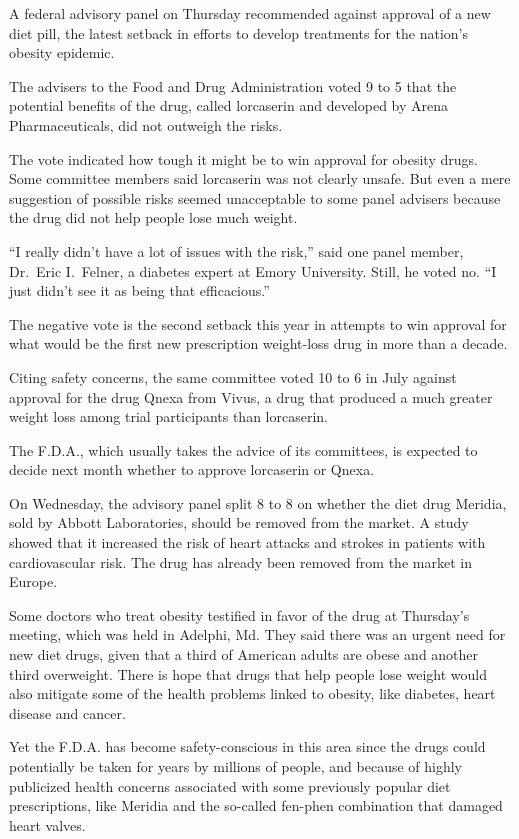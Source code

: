 ﻿\documentclass[12pt]{article}
\begin{document}
\lettrine{A}{} federal advisory panel on Thursday recommended against
approval of a new diet pill, the latest setback in efforts to develop treatments for the nation's
obesity epidemic.

The advisers to the Food and Drug Administration voted 9 to 5 that the potential benefits of the
drug, called lorcaserin and developed by Arena Pharmaceuticals, did not outweigh the risks.

The vote indicated how tough it might be to win approval for obesity drugs. Some committee members
said lorcaserin was not clearly unsafe. But even a mere suggestion of possible risks seemed
unacceptable to some panel advisers because the drug did not help people lose much weight.

``I really didn't have a lot of issues with the risk,'' said one panel member, Dr.~Eric I.~Felner, a
diabetes expert at Emory University. Still, he voted no. ``I just didn't see it as being that
efficacious.''

The negative vote is the second setback this year in attempts to win approval for what would be the
first new prescription weight-loss drug in more than a decade.

Citing safety concerns, the same committee voted 10 to 6 in July against approval for the drug Qnexa
from Vivus, a drug that produced a much greater weight loss among trial participants than
lorcaserin.

The F.D.A., which usually takes the advice of its committees, is expected to decide next month
whether to approve lorcaserin or Qnexa.

On Wednesday, the advisory panel split 8 to 8 on whether the diet drug Meridia, sold by Abbott
Laboratories, should be removed from the market. A study showed that it increased the risk of heart
attacks and strokes in patients with cardiovascular risk. The drug has already been removed from the
market in Europe.

Some doctors who treat obesity testified in favor of the drug at Thursday's meeting, which was held
in Adelphi, Md. They said there was an urgent need for new diet drugs, given that a third of
American adults are obese and another third overweight. There is hope that drugs that help people
lose weight would also mitigate some of the health problems linked to obesity, like diabetes, heart
disease and cancer.

Yet the F.D.A. has become safety-conscious in this area since the drugs could potentially be taken
for years by millions of people, and because of highly publicized health concerns associated with
some previously popular diet prescriptions, like Meridia and the so-called fen-phen combination that
damaged heart valves.
\end{document}
